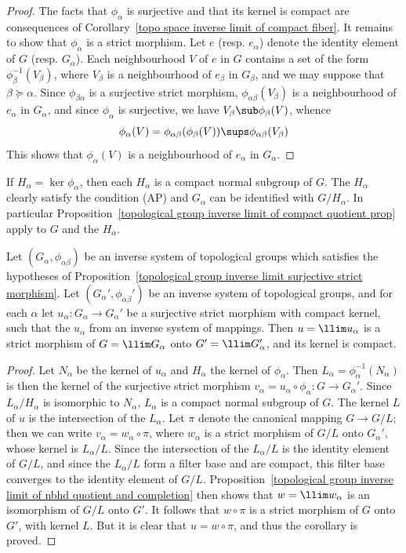 \begin{proof}
The facts that $\phi_\alpha$ is surjective and that its kernel is compact are consequences of Corollary~\ref{topo space inverse limit of compact fiber}. It remains to show that $\phi_\alpha$ is a strict morphism. Let $e$ (resp. $e_\alpha$) denote the identity element of $G$ (resp. $G_\alpha$). Each neighbourhood $V$ of $e$ in $G$ contains a set of the form $\phi_\beta^{-1}(V_\beta)$, where $V_\beta$ is a neighbourhood of $e_\beta$ in $G_\beta$, and we may suppose that $\beta\succeq\alpha$. Since $\phi_{\beta\alpha}$ is a surjective strict morphism, $\phi_{\alpha\beta}(V_\beta)$ is a neighbourhood of $e_\alpha$ in $G_\alpha$, and since $\phi_\alpha$ is surjective, we have $V_\beta\sub\phi_\beta(V)$, whence
\[\phi_\alpha(V)=\phi_{\alpha\beta}(\phi_\beta(V))\sups\phi_{\alpha\beta}(V_\beta)\]
This shows that $\phi_\alpha(V)$ is a neighbourhood of $e_\alpha$ in $G_\alpha$.
\end{proof}
If $H_\alpha=\ker\phi_\alpha$, then each $H_\alpha$ is a compact normal subgroup of $G$. The $H_\alpha$ clearly satisfy the condition (AP) and $G_\alpha$ can be identified with $G/H_\alpha$. In particular Proposition~\ref{topological group inverse limit of compact quotient prop} apply to $G$ and the $H_\alpha$.
\begin{corollary}\label{topological group inverse limit of surjective strict morphisms}
Let $(G_\alpha,\phi_{\alpha\beta})$ be an inverse system of topological groups which satisfies the hypotheses of Proposition~\ref{topological group inverse limit surjective strict morphism}. Let $(G_\alpha',\phi_{\alpha\beta}')$ be an inverse system of topological groups, and for each $\alpha$ let $u_\alpha:G_\alpha\to G_\alpha'$ be a surjective strict morphism with compact kernel, such that the $u_\alpha$ from an inverse system of mappings. Then $u=\llim u_\alpha$ is a strict morphism of $G=\llim G_\alpha$ onto $G'=\llim G_\alpha'$, and its kernel is compact.
\end{corollary}
\begin{proof}
Let $N_\alpha$ be the kernel of $u_\alpha$ and $H_\alpha$ the kernel of $\phi_\alpha$. Then $L_\alpha=\phi_\alpha^{-1}(N_\alpha)$ is then the kernel of the surjective strict morphism $v_\alpha=u_\alpha\circ\phi_\alpha:G\to G_\alpha'$. Since $L_\alpha/H_\alpha$ is isomorphic to $N_\alpha$, $L_\alpha$ is a compact normal subgroup of $G$. The kernel $L$ of $u$ is the intersection of the $L_\alpha$. Let $\pi$ denote the canonical mapping $G\to G/L$; then we can write $v_\alpha=w_\alpha\circ\pi$, where $w_\alpha$ is a strict morphism of $G/L$ onto $G_\alpha'$, whose kernel is $L_\alpha/L$. Since the intersection of the $L_\alpha/L$ is the identity element of $G/L$, and since the $L_\alpha/L$ form a filter base and are compact, this filter base converges to the identity element of $G/L$. Proposition~\ref{topological group inverse limit of nbhd quotient and completion} then shows that $w=\llim w_\alpha$ is an isomorphism of $G/L$ onto $G'$. It follows that $w\circ\pi$ is a strict morphism of $G$ onto $G'$, with kernel $L$. But it is clear that $u=w\circ\pi$, and thus the corollary is proved.
\end{proof}
